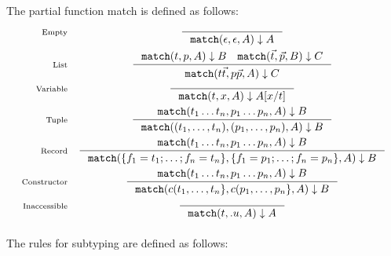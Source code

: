 \documentclass{article}
\newcommand{\rlbl}[1]{\mathrm{\scriptstyle{}#1}}
\begin{document}

The partial function match is defined as follows:
\[
\begin{array}{rc}
\rlbl{Empty}&
\inference{}{\pmatch{\epsilon}{\epsilon}{A}{A}}\\[1em]
\rlbl{List}&
\inference{\pmatch{t}{p}{A}{B}
    \quad  \pmatch{\vec{t}}{\vec{p}}{B}{C}}
          {\pmatch{t \vec{t}}{p \vec{p}}{A}{C}}\\[1em]
\rlbl{Variable}&
\inference{}
          {\pmatch{t}{x}{A}{A[x/t]}}\\[1em]
\rlbl{Tuple}&
\inference{\pmatch{t_1 \dots t_n}{p_1 \dots p_n}{A}{B}}
          {\pmatch{(t_1, \dots, t_n)}{(p_1, \dots, p_n)}{A}{B}}\\[1em]
\rlbl{Record}&
\inference{\pmatch{t_1 \dots t_n}{p_1 \dots p_n}{A}{B}}
          {\pmatch{\{ f_1 = t_1; \dots; f_n = t_n\}}
                  {\{ f_1 = p_1; \dots; f_n = p_n\}}
                  {A}
                  {B}}\\[1em]
\rlbl{Constructor}&
\inference{\pmatch{t_1 \dots t_n}{p_1 \dots p_n}{A}{B}}
          {\pmatch{c(t_1, \dots, t_n\}}
                  {c(p_1, \dots, p_n\}}
                  {A}
                  {B}}\\[1em]
\rlbl{Inaccessible}&
\inference{}
          {\pmatch{t}{.u}{A}{A}}\\[1em]
\end{array}
\]

The rules for subtyping are defined as follows:
\end{document}

